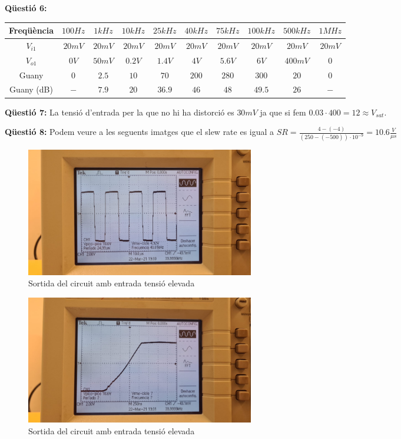 \documentclass[12pt, a4papre]{article}
\begin{document}
	\textbf{Qüestió 6:}
	
	\begin{center}
		\scriptsize
		\begin{tabular}{ |c|c|c|c|c|c|c|c|c|c| } 
			\hline
			Freqüència & $100Hz$ & $1kHz$ & $10kHz$ & $25kHz$ & $40kHz$ & $75kHz$ & $100kHz$ & $500kHz$ & $1MHz$\\ \hline
			$V_{i1}$ & $20mV$ & $20mV$ & $20mV$ & $20mV$ & $20mV$ & $20mV$ & $20mV$ & $20mV$ & $20mV$\\ \hline
			$V_{o1}$ & $0V$ & $50mV$ & $0.2V$ & $1.4V$ & $4V$ & $5.6V$ & $6V$ & $400mV$ & $0$\\ \hline
			Guany & $0$ & $2.5$ & $10$ & $70$ & $200$ & $280$ & $300$ & $20$ & $0$\\ \hline
			Guany (dB) & $-$ & $7.9$ & $20$ & $36.9$ & $46$ & $48$ & $49.5$ & $26$ & $-$\\ \hline
		\end{tabular}
	\end{center}
	
	\textbf{Qüestió 7:} La tensió d'entrada per la que no hi ha distorció es $30mV$ ja que si fem $0.03\cdot 400 = 12 \approx V_{sat}$.

	\textbf{Qüestió 8:} Podem veure a les seguents imatges que el slew rate es igual a $SR = \frac{4-(-4)}{(250-(-500))\cdot 10^{-9}} = 10.6\frac{V}{\mu s}$
	
	\begin{figure}[H]
		\begin{center}
		\includegraphics[width=100mm]{img_2_5.jpeg}
		\caption{Sortida del circuit amb entrada tensió elevada}
		\end{center}
	\end{figure}
	
	\begin{figure}[H]
		\begin{center}
		\includegraphics[width=100mm]{img_2_6.jpeg}
		\caption{Sortida del circuit amb entrada tensió elevada}
		\end{center}
	\end{figure}
	
\end{document}
